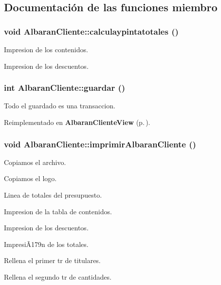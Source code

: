 \subsection{Documentaci\'{o}n de las funciones miembro}
\subsubsection{\setlength{\rightskip}{0pt plus 5cm}void Albaran\-Cliente::calculaypintatotales ()\hspace{0.3cm}{\tt  [virtual]}}\label{classAlbaranCliente_a2}


Impresion de los contenidos.

Impresion de los descuentos. 
\subsubsection{\setlength{\rightskip}{0pt plus 5cm}int Albaran\-Cliente::guardar ()\hspace{0.3cm}{\tt  [virtual]}}\label{classAlbaranCliente_a11}


Todo el guardado es una transaccion. 

Reimplementado en {\bf Albaran\-Cliente\-View} {\rm (p.\,\pageref{classAlbaranClienteView_a5})}.
\subsubsection{\setlength{\rightskip}{0pt plus 5cm}void Albaran\-Cliente::imprimir\-Albaran\-Cliente ()}\label{classAlbaranCliente_a17}


Copiamos el archivo.

Copiamos el logo.

Linea de totales del presupuesto.

Impresion de la tabla de contenidos.

Impresion de los descuentos.

Impresi\~{A}179n de los totales.

Rellena el primer tr de titulares.

Rellena el segundo tr de cantidades. 
